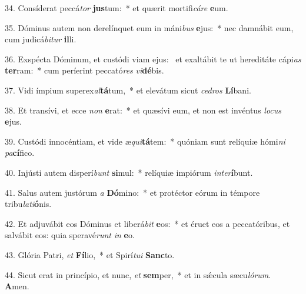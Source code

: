 34. Consíderat peccá\textit{tor} \textbf{jus}tum:~*  et quærit mortifi\textit{cá}\textit{re} \textbf{e}um.\

35. Dóminus autem non derelínquet eum in máni\textit{bus} \textbf{e}jus:~*  nec damnábit eum, cum judicá\textit{bi}\textit{tur} \textbf{il}li.\

36. Exspécta Dóminum, et custódi viam ejus: \dag\  et exaltábit te ut hereditáte cápi\textit{as} \textbf{ter}ram:~*  cum períerint peccató\textit{res} \textit{vi}\textbf{dé}bis.\

37. Vidi ímpium superex\textit{al}\textbf{tá}tum,~*  et elevátum sicut \textit{ce}\textit{dros} \textbf{Lí}bani.\

38. Et transívi, et ecce \textit{non} \textbf{e}rat:~*  et quæsívi eum, et non est invéntus \textit{lo}\textit{cus} \textbf{e}jus.\

39. Custódi innocéntiam, et vide æ\textit{qui}\textbf{tá}tem:~*  quóniam sunt relíquiæ hómi\textit{ni} \textit{pa}\textbf{cí}fico.\

40. Injústi autem disperí\textit{bunt} \textbf{si}mul:~*  relíquiæ impiórum \textit{in}\textit{ter}\textbf{í}bunt.\

41. Salus autem justórum \textit{a} \textbf{Dó}mino:~*  et protéctor eórum in témpore tribu\textit{la}\textit{ti}\textbf{ó}nis.\

42. Et adjuvábit eos Dóminus et liberá\textit{bit} \textbf{e}os:~*  et éruet eos a peccatóribus, et salvábit eos: quia speravé\textit{runt} \textit{in} \textbf{e}o.\

43. Glória Patri, \textit{et} \textbf{Fí}lio,~*  et Spirí\textit{tu}\textit{i} \textbf{Sanc}to.\

44. Sicut erat in princípio, et nunc, \textit{et} \textbf{sem}per,~*  et in sǽcula sæcu\textit{ló}\textit{rum}. \textbf{A}men.\

